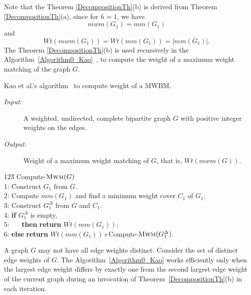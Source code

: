 \documentclass[runningheads,a4paper]{llncs}
\begin{document}
Note that the Theorem \ref{DecompositionTh}(b) is derived from
Theorem \ref{DecompositionTh}(a), since for $h=1$, we have $$\textit{mwm}(G_1)=
\textit{mm}(G_1)$$ and 
$$\textit{Wt}(\textit{mwm}(G_1))=\textit{Wt}(\textit{mm}(G_1))=|\textit{mm}(G_1)|.$$ 
The Theorem
\ref{DecompositionTh}(b) is used recursively in the Algorithm~\ref{Algorithm0_Kao}~\cite{kao02},
to compute the weight of a maximum weight matching of the graph $G$.




\begin{algorithm}[H]
{\caption[Kao et al.'s algorithm to compute weight of a MWBM.]{Kao et al.'s algorithm~\cite{kao02} to compute weight of a MWBM.}
\label{Algorithm0_Kao}
\begin{description}
\item[\it Input:] A weighted, undirected, complete bipartite graph $G$ with
positive integer weights on the edges.
\item[\it Output:] Weight of a maximum weight matching of $G$, that is, $\textit{Wt}(\textit{mwm}(G))$.
\end{description}
\begin{tabbing}
123\=\kill
{Compute-$\textsc{Mwm}(G)$}\+\\
1: \= Construct $G_1$ from $G$.\\
2:   \> Compute $\textit{mm}(G_1)$ and find a minimum weight cover $C_1$ of $G_1$.\\
3:   \> Construct $G_1^\Delta$ from $G$ and $C_1$.\\
4:   \> \textbf{if} $G_1^\Delta$ is empty,\\
5:\>~~~ \textbf{then} \textbf{return} $\textit{Wt}(\textit{mm}(G_1))$;\\
6:\> \textbf{else} \textbf{return} $\textit{Wt}(\textit{mm}(G_1))$+Compute-$\textsc{Mwm}(G_1^\Delta)$.
\end{tabbing}
}
\end{algorithm}



\begin{remark}
A graph $G$ may not have all edge weights distinct. Consider the set of distinct edge
weights of $G$. The Algorithm~\ref{Algorithm0_Kao} works efficiently only when the largest
edge weight differs by exactly one from the second largest edge weight of the current graph during an invocation of Theorem~\ref{DecompositionTh}(b) in each iteration.  
\end{remark}
\end{document}
